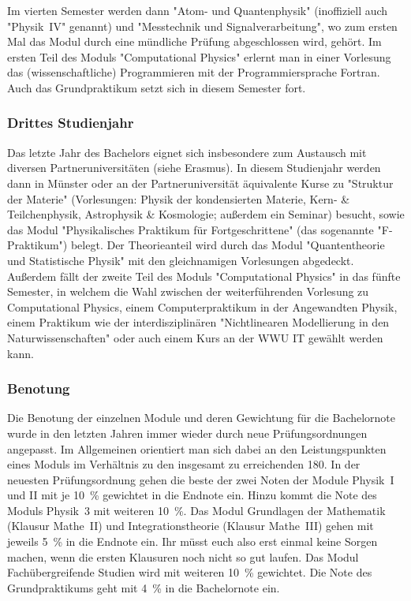 \begin{multicols}{2}
Im vierten Semester werden dann "Atom- und Quantenphysik" (inoffiziell auch "Physik~IV" genannt) und "Messtechnik und Signalverarbeitung", wo zum ersten Mal das Modul durch eine mündliche Prüfung abgeschlossen wird, gehört.
Im ersten Teil des Moduls "Computational Physics" erlernt man in einer Vorlesung das (wissenschaftliche) Programmieren mit der Programmiersprache Fortran.
Auch das Grundpraktikum setzt sich in diesem Semester fort.

\subsubsection{Drittes Studienjahr}
Das letzte Jahr des Bachelors eignet sich insbesondere zum Austausch mit diversen Partneruniversitäten (siehe Erasmus).
In diesem Studienjahr werden dann in Münster oder an der Partneruniversität äquivalente Kurse zu "Struktur der Materie" (Vorlesungen: Physik der kondensierten Materie, Kern- \& Teilchenphysik, Astrophysik \& Kosmologie; außerdem ein Seminar) besucht, sowie das Modul "Physikalisches Praktikum für Fortgeschrittene" (das sogenannte "F-Praktikum") belegt.
Der Theorieanteil wird durch das Modul "Quantentheorie und Statistische Physik" mit den gleichnamigen Vorlesungen abgedeckt.
Außerdem fällt der zweite Teil des Moduls "Computational Physics" in das fünfte Semester, in welchem die Wahl zwischen der weiterführenden Vorlesung zu Computational Physics, einem Computerpraktikum in der Angewandten Physik, einem Praktikum wie der interdisziplinären "Nichtlinearen Modellierung in den Naturwissenschaften" oder auch einem Kurs an der WWU IT gewählt werden kann.

\subsubsection{Benotung}
Die Benotung der einzelnen Module und deren Gewichtung für die Bachelornote wurde in den letzten Jahren immer wieder durch neue Prüfungsordnungen angepasst.
Im Allgemeinen orientiert man sich dabei an den Leistungspunkten eines Moduls im Verhältnis zu den insgesamt zu erreichenden \SI{180}{\LP}.
In der neuesten Prüfungsordnung gehen die beste der zwei Noten der Module Physik~I und II mit je \SI{10}{\percent} gewichtet in die Endnote ein. Hinzu kommt die Note des Moduls Physik~3 mit weiteren \SI{10}{\percent}.
Das Modul Grundlagen der Mathematik (Klausur Mathe~II) und Integrationstheorie (Klausur Mathe~III) gehen mit jeweils \SI{5}{\percent} in die Endnote ein.
Ihr müsst euch also erst einmal keine Sorgen machen, wenn die ersten Klausuren noch nicht so gut laufen.
Das Modul Fachübergreifende Studien wird mit weiteren \SI{10}{\percent} gewichtet.
Die Note des Grundpraktikums geht mit \SI{4}{\percent} in die Bachelornote ein.


\end{multicols}
